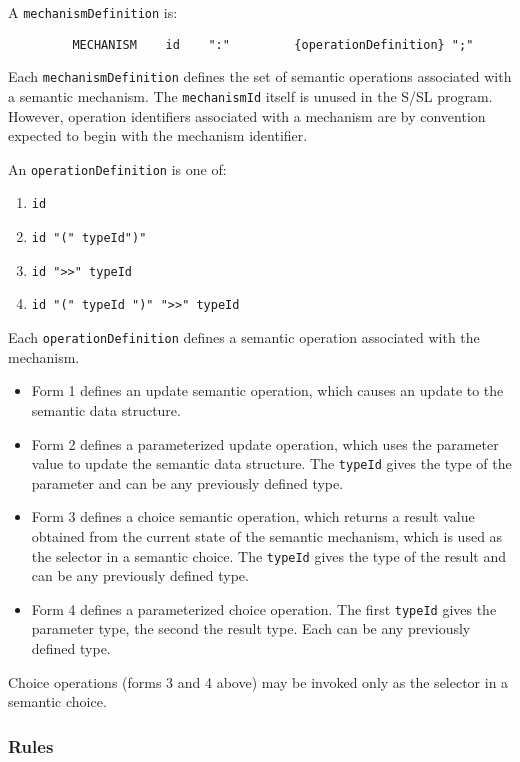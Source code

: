 A {\tt mechanismDefinition} is:
\begin{tscreen}
\begin{verbatim}
         MECHANISM    id    ":"         {operationDefinition} ";"
\end{verbatim}
\end{tscreen}

Each {\tt mechanismDefinition}  defines  the  set        of semantic
operations associated with a semantic mechanism.  The 
{\tt mechanismId} itself is unused in the S/SL program.  However, 
operation identifiers associated with a mechanism are by 
convention expected to begin with the mechanism identifier.

An {\tt operationDefinition} is one of:
\begin{enumerate}
\item {\tt id}
\item {\tt id "(" typeId")"}
\item {\tt id ">>" typeId}
\item {\tt id "(" typeId ")" ">>" typeId}
\end{enumerate}


Each {\tt operationDefinition} defines  a  semantic operation
associated with the mechanism.
\begin{itemize}
\item Form 1 defines  an         update  semantic  operation,  which
causes an update to the semantic data structure.
\item Form 2 defines a parameterized update operation, which
uses the parameter value to update the semantic data  
structure.  The {\tt typeId} gives the type of the parameter and can be
any previously defined type.
\item Form 3  defines  a         choice  semantic  operation,  which
returns  a  result  value obtained from the current state of
the semantic mechanism, which is used as the selector  in  a
semantic  choice.   The  {\tt typeId} gives the type of the result
and can be any previously defined type.
\item Form 4 defines a parameterized choice  operation. The
first {\tt typeId} gives the parameter type, the second the result
type.  Each can be any previously defined type.
\end{itemize}

Choice operations  (forms 3 and 4 above)  may  be
invoked only as the selector in a semantic choice.




\subsubsection{Rules}

